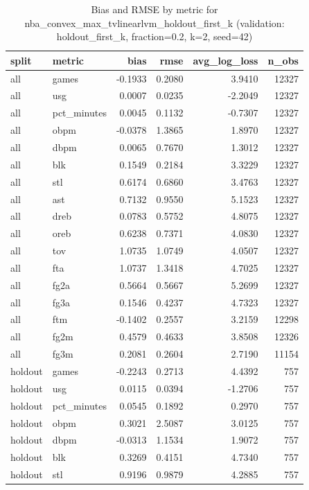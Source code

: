 \begin{table}
\caption{Bias and RMSE by metric for nba_convex_max_tvlinearlvm_holdout_first_k (validation: holdout_first_k, fraction=0.2, k=2, seed=42)}
\label{tab:nba_convex_max_tvlinearlvm_holdout_first_k_vs_holdout_first_k_f20_k2_s42_bias_rmse}
\begin{tabular}{llrrrr}
\toprule
split & metric & bias & rmse & avg\_log\_loss & n\_obs \\
\midrule
all & games & -0.1933 & 0.2080 & 3.9410 & 12327 \\
all & usg & 0.0007 & 0.0235 & -2.2049 & 12327 \\
all & pct\_minutes & 0.0045 & 0.1132 & -0.7307 & 12327 \\
all & obpm & -0.0378 & 1.3865 & 1.8970 & 12327 \\
all & dbpm & 0.0065 & 0.7670 & 1.3012 & 12327 \\
all & blk & 0.1549 & 0.2184 & 3.3229 & 12327 \\
all & stl & 0.6174 & 0.6860 & 3.4763 & 12327 \\
all & ast & 0.7132 & 0.9550 & 5.1523 & 12327 \\
all & dreb & 0.0783 & 0.5752 & 4.8075 & 12327 \\
all & oreb & 0.6238 & 0.7371 & 4.0830 & 12327 \\
all & tov & 1.0735 & 1.0749 & 4.0507 & 12327 \\
all & fta & 1.0737 & 1.3418 & 4.7025 & 12327 \\
all & fg2a & 0.5664 & 0.5667 & 5.2699 & 12327 \\
all & fg3a & 0.1546 & 0.4237 & 4.7323 & 12327 \\
all & ftm & -0.1402 & 0.2557 & 3.2159 & 12298 \\
all & fg2m & 0.4579 & 0.4633 & 3.8508 & 12326 \\
all & fg3m & 0.2081 & 0.2604 & 2.7190 & 11154 \\
holdout & games & -0.2243 & 0.2713 & 4.4392 & 757 \\
holdout & usg & 0.0115 & 0.0394 & -1.2706 & 757 \\
holdout & pct\_minutes & 0.0545 & 0.1892 & 0.2970 & 757 \\
holdout & obpm & 0.3021 & 2.5087 & 3.0125 & 757 \\
holdout & dbpm & -0.0313 & 1.1534 & 1.9072 & 757 \\
holdout & blk & 0.3269 & 0.4151 & 4.7340 & 757 \\
holdout & stl & 0.9196 & 0.9879 & 4.2885 & 757 \\

\end{tabular}
\end{table}
